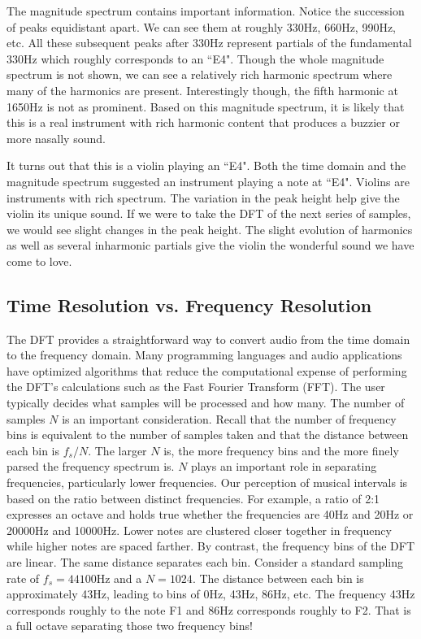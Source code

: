 The magnitude spectrum contains important
information.  Notice the succession of peaks equidistant apart.  We can see them at roughly 330Hz, 660Hz,
990Hz, etc.  All these subsequent peaks after 330Hz represent partials of the fundamental 330Hz which
roughly corresponds to an ``E4".  Though the whole magnitude spectrum is not shown, we can see a
relatively rich harmonic spectrum where many of the harmonics are present.  Interestingly though, the
fifth harmonic at 1650Hz is not as prominent.  Based on this magnitude spectrum, it is likely that this
is a real instrument with rich harmonic content that produces a buzzier or more nasally sound.  

It turns out that this is a violin playing an ``E4".  Both the time domain and the magnitude spectrum suggested
an instrument playing a note at ``E4".  Violins are instruments with rich spectrum.  The variation in the peak
height help give the violin its unique sound.  If we were to take the DFT of the next series of samples, we would
see slight changes in the peak height.  The slight evolution of harmonics as well as several inharmonic partials
give the violin the wonderful sound we have come to love.

\subsection*{Time Resolution vs. Frequency Resolution}

The DFT provides a straightforward way to convert audio from the time domain to the frequency domain.  Many
programming languages and audio applications have optimized algorithms that reduce the computational 
expense of performing the DFT's calculations such as the Fast Fourier Transform (FFT).
The user typically decides what samples will be processed and how many.  The number of samples $N$ is an important
consideration.  Recall that the number of frequency bins is equivalent to the number of samples taken and that the
distance between each bin is $f_s/N$.  The larger $N$ is, the more frequency bins and the more finely parsed the frequency spectrum is.  $N$ plays an important role in separating frequencies, particularly lower frequencies.  Our perception of musical intervals is based on the ratio between distinct frequencies.  For example, a ratio of 
2:1 expresses an
octave and holds true whether the frequencies are 40Hz and 20Hz or 20000Hz and 10000Hz.  Lower notes are 
clustered closer together in frequency while higher notes are spaced farther.  By contrast, the 
frequency bins of the DFT are linear.  The same distance separates each bin.  Consider a standard sampling 
rate of $f_s = 44100$Hz and a $N = 1024$.  The distance between each bin is approximately 43Hz, leading to 
bins of 0Hz, 43Hz, 86Hz, etc.  The frequency 43Hz corresponds roughly to the note F1 and 86Hz corresponds
roughly to F2.  That is a full octave separating those two frequency bins!  

